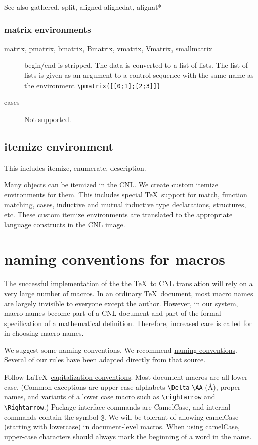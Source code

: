 \documentclass[12pt]{amsart}
\begin{document}
See also gathered, split, aligned alignedat, alignat* 

\subsubsection{matrix environments}

\begin{description}
\item [matrix, pmatrix, bmatrix, Bmatrix, vmatrix, Vmatrix, smallmatrix]   begin/end is stripped. The data is converted to a list of lists.  The list of lists is
given as an argument to a control sequence with the same name as the environment \verb!\pmatrix{[[0;1];[2;3]]}!
\item [cases] Not supported.
\end{description}



\subsection{itemize environment}

This includes itemize, enumerate, description.

Many objects can be itemized in the CNL.  We create
custom itemize environments for them.
This includes special \TeX\ support for match, function matching,
cases, inductive
and mutual inductive type declarations, structures, etc.
These custom itemize environments are translated to the
appropriate language constructs in the CNL image.

\section{naming conventions for macros}

The successful implementation of the the \TeX\ to CNL translation
will rely on a very large number of macros.  In an ordinary \TeX\ document,
most macro names are largely invisible to everyone except the author.
However, in our system,
macro names become part of a CNL document and part of
the formal specification of a mathematical definition.  Therefore, increased
care is called for in choosing macro names.


We suggest some naming conventions.
We recommend
\href{https://hilton.org.uk/presentations/naming-guidelines}{naming-conventions}.
Several of our rules have been adapted directly from that source.


Follow \LaTeX\ 
\href{https://tex.stackexchange.com/questions/48195/macro-naming-best-practice}{capitalization conventions}.  Most document macros are all lower case.
(Common exceptions are upper case alphabets \verb!\Delta! \verb!\AA! (\AA), 
proper names,  
and variants of a lower case macro
such as \verb!\rightarrow! and \verb!\Rightarrow!.)
Package interface commands are CamelCase, and internal commands contain
the symbol \verb!@!.  
We will be tolerant of allowing camelCase (starting with lowercase) in 
document-level macros.  When using camelCase, upper-case characters
should always mark the beginning of a word in the name.
\end{document}
